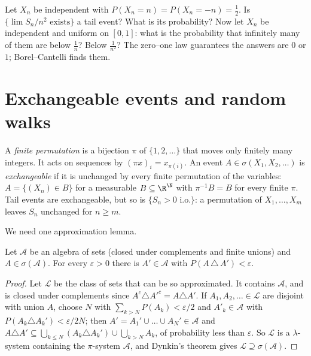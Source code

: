 \begin{think}
Let $X_n$ be independent with $P(X_n=n)=P(X_n=-n)=\frac12$. Is $\{\lim S_n/n^2\text{ exists}\}$ a tail event? What is its
probability? Now let $X_n$ be independent and uniform on $[0,1]$: what is the probability that infinitely many of them are
below $\frac1n$? Below $\frac1{n^2}$? The zero--one law guarantees the answers are $0$ or $1$; Borel--Cantelli finds them.
\end{think}

\section{Exchangeable events and random walks}

A \emph{finite permutation} is a bijection $\pi$ of $\{1,2,\dots\}$ that moves only finitely many integers. It acts on
sequences by $(\pi x)_i=x_{\pi(i)}$. An event $A\in\sigma(X_1,X_2,\dots)$ is \emph{exchangeable} if it is unchanged by every
finite permutation of the variables: $A=\{(X_n)\in B\}$ for a measurable $B\subseteq\R^{\N}$ with $\pi^{-1}B=B$ for every
finite $\pi$. Tail events are exchangeable, but so is $\{S_n>0\text{ i.o.}\}$: a permutation of $X_1,\dots,X_m$ leaves
$S_n$ unchanged for $n\ge m$.

We need one approximation lemma.

\begin{lemma}\label{lem:approx}
Let $\mathcal A$ be an algebra of sets (closed under complements and finite unions) and $A\in\sigma(\mathcal A)$. For every
$\varepsilon>0$ there is $A'\in\mathcal A$ with $P(A\,\triangle\,A')<\varepsilon$.
\end{lemma}
\begin{proof}
Let $\mathcal L$ be the class of sets that can be so approximated. It contains $\mathcal A$, and is closed under complements
since $A^c\triangle A'^c=A\triangle A'$. If $A_1,A_2,\dots\in\mathcal L$ are disjoint with union $A$, choose $N$ with
$\sum_{k>N}P(A_k)<\varepsilon/2$ and $A'_k\in\mathcal A$ with $P(A_k\triangle A_k')<\varepsilon/2N$; then
$A'=A_1'\cup\dots\cup A_N'\in\mathcal A$ and $A\triangle A'\subseteq\bigcup_{k\le N}(A_k\triangle A_k')\cup\bigcup_{k>N}A_k$,
of probability less than $\varepsilon$. So $\mathcal L$ is a $\lambda$-system containing the $\pi$-system $\mathcal A$, and
Dynkin's theorem gives $\mathcal L\supseteq\sigma(\mathcal A)$.
\end{proof}


